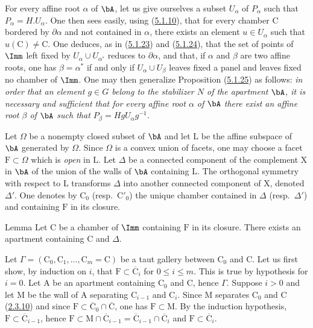 \documentclass[12pt,a4paper,oneside,english]{smfart}
\makeatletter
\newcommand{\btanchor}[1]{\leavevmode\Hy@raisedlink{\hypertarget{bt:#1}{}}}
\newcommand{\btref}[1]{\hyperlink{bt:#1}{#1}}
\theoremstyle{definition}
\theoremstyle{bt}
\makeatother
\begin{document}
\btanchor{5.1.26}
For every affine root $\alpha$ of $\bA$, let us give ourselves a subset
$U_{\alpha}$ of $P_{\alpha}$ such that $P_{\alpha}=H.U_{\alpha}$. One then sees
easily, using (\btref{5.1.10}), that for every chamber $\mathrm{C}$ bordered by
$\partial\alpha$ and not contained in $\alpha$, there exists an element
$u\in U_{\alpha}$ such that $u(\mathrm{C})\neq \mathrm{C}$. One deduces, as in
(\btref{5.1.23}) and (\btref{5.1.24}), that the set of points of $\Imm$ left fixed by
$U_{\alpha}\cup U_{\alpha^{*}}$ reduces to $\partial\alpha$, and that, if
$\alpha$ and $\beta$ are two affine roots, one has $\beta=\alpha^{*}$ if and
only if $U_{\alpha}\cup U_{\beta}$ leaves fixed a panel and leaves fixed no
chamber of $\Imm$. One may then generalize Proposition (\btref{5.1.25}) as follows:
\emph{in order that an element $g\in G$ belong to the stabilizer $N$ of the
apartment $\bA$, it is necessary and sufficient that for every affine root
$\alpha$ of $\bA$ there exist an affine root $\beta$ of $\bA$ such that
$P_{\beta}=HgU_{\alpha}g^{-1}$.}

\btanchor{5.1.27}
Let $\Omega$ be a nonempty closed subset of $\bA$ and let $\mathrm{L}$ be the
affine subspace of $\bA$ generated by $\Omega$. Since $\Omega$ is a convex union
of facets, one may choose a facet $\mathrm{F}\subset\Omega$ which is
\emph{open} in $\mathrm{L}$. Let $\Delta$ be a connected component of the
complement $\mathrm{X}$ in $\bA$ of the union of the walls of $\bA$ containing
$\mathrm{L}$. The orthogonal symmetry with respect to $\mathrm{L}$ transforms
$\Delta$ into another connected component of $\mathrm{X}$, denoted $\Delta'$.
One denotes by $\mathrm{C}_{0}$ (resp.\ $\mathrm{C}'_{0}$) the unique chamber
contained in $\Delta$ (resp.\ $\Delta'$) and containing $\mathrm{F}$ in its
closure.

\begin{btstatu}{Lemma}
Let $\mathrm{C}$ be a chamber of $\Imm$ containing $\mathrm{F}$ in its closure.
There exists an apartment containing $\mathrm{C}$ and $\Delta$.
\end{btstatu}

Let $\Gamma=(\mathrm{C}_{0},\mathrm{C}_{1},\dots,\mathrm{C}_{m}=\mathrm{C})$ be a
taut gallery between $\mathrm{C}_{0}$ and $\mathrm{C}$. Let us first show, by
induction on $i$, that $\mathrm{F}\subset\overline{\mathrm{C}}_{i}$ for
$0\leqslant i\leqslant m$. This is true by hypothesis for $i=0$. Let $\mathrm{A}$
be an apartment containing $\mathrm{C}_{0}$ and $\mathrm{C}$, hence $\Gamma$.
Suppose $i>0$ and let $\mathrm{M}$ be the wall of $\mathrm{A}$ separating
$\mathrm{C}_{i-1}$ and $\mathrm{C}_{i}$. Since $\mathrm{M}$ separates
$\mathrm{C}_{0}$ and $\mathrm{C}$ (\btref{2.3.10}) and since
$\mathrm{F}\subset\overline{\mathrm{C}}_{0}\cap\overline{\mathrm{C}}$, one has
$\mathrm{F}\subset \mathrm{M}$. By the induction hypothesis,
$\mathrm{F}\subset\overline{\mathrm{C}}_{i-1}$, hence
$\mathrm{F}\subset \mathrm{M}\cap\overline{\mathrm{C}}_{i-1}
=\overline{\mathrm{C}}_{i-1}\cap\overline{\mathrm{C}}_{i}$ and
$\mathrm{F}\subset\overline{\mathrm{C}}_{i}$.
\end{document}
